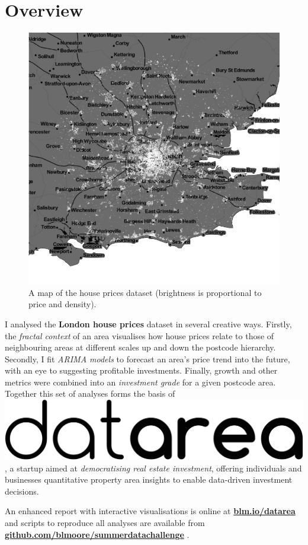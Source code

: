 \documentclass[
10pt, %
a4paper, %
oneside, %
headinclude,footinclude, %
BCOR5mm, %
]{scrartcl}
\newcommand*{\logo}{\includegraphics[scale=.04]{Figures/logotext.png}}
\begin{document}
\section*{Overview} 

\setlength{\intextsep}{0em}
\begin{figure}
\centering
\includegraphics[width=.28\textwidth]{Figures/overview.png}
\vspace{-1em}
\caption*{ A map of the house prices dataset (brightness is proportional to
  price and density).}
\end{figure}

I analysed the {\bf London house prices} dataset in several creative
ways. Firstly, the \emph{fractal context} of an area visualises how house
prices relate to those of neighbouring areas at different scales up
and down the postcode hierarchy. Secondly, I fit \emph{ARIMA models}
to forecast an area's price trend into the future, with an eye to
suggesting profitable investments. Finally, growth and other metrics
were combined into an \emph{investment grade} for a given postcode
area. Together this set of analyses forms the basis of \logo, a
startup aimed at \emph{democratising real estate investment}, offering
individuals and businesses quantitative property area insights to
enable data-driven investment decisions.

An enhanced report with interactive visualisations is online at 
{\bf \leavevmode\href{http://blm.io/datarea}{blm.io/datarea} } 
and scripts to reproduce all analyses are available from 
{\bf
  \leavevmode\href{http://github.com/blmoore/summerdatachallenge}{github.com/blmoore/summerdatachallenge}
}.


\end{document}
